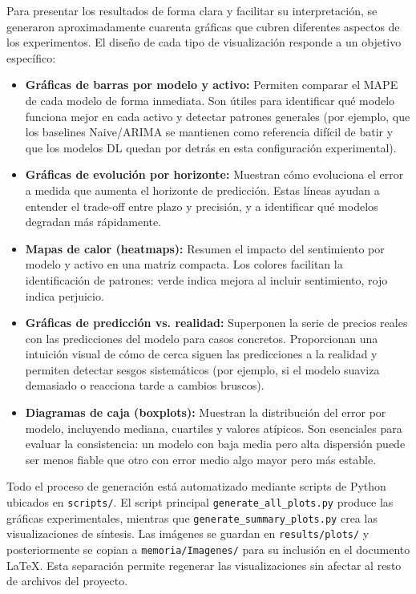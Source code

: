 Para presentar los resultados de forma clara y facilitar su interpretación, se generaron aproximadamente cuarenta gráficas que cubren diferentes aspectos de los experimentos. El diseño de cada tipo de visualización responde a un objetivo específico:

\begin{itemize}
    \item \textbf{Gráficas de barras por modelo y activo:} Permiten comparar el MAPE de cada modelo de forma inmediata. Son útiles para identificar qué modelo funciona mejor en cada activo y detectar patrones generales (por ejemplo, que los baselines Naive/ARIMA se mantienen como referencia difícil de batir y que los modelos DL quedan por detrás en esta configuración experimental).
    
    \item \textbf{Gráficas de evolución por horizonte:} Muestran cómo evoluciona el error a medida que aumenta el horizonte de predicción. Estas líneas ayudan a entender el trade-off entre plazo y precisión, y a identificar qué modelos degradan más rápidamente.
    
    \item \textbf{Mapas de calor (heatmaps):} Resumen el impacto del sentimiento por modelo y activo en una matriz compacta. Los colores facilitan la identificación de patrones: verde indica mejora al incluir sentimiento, rojo indica perjuicio.
    
    \item \textbf{Gráficas de predicción vs. realidad:} Superponen la serie de precios reales con las predicciones del modelo para casos concretos. Proporcionan una intuición visual de cómo de cerca siguen las predicciones a la realidad y permiten detectar sesgos sistemáticos (por ejemplo, si el modelo suaviza demasiado o reacciona tarde a cambios bruscos).
    
    \item \textbf{Diagramas de caja (boxplots):} Muestran la distribución del error por modelo, incluyendo mediana, cuartiles y valores atípicos. Son esenciales para evaluar la consistencia: un modelo con baja media pero alta dispersión puede ser menos fiable que otro con error medio algo mayor pero más estable.
\end{itemize}

Todo el proceso de generación está automatizado mediante scripts de Python ubicados en \texttt{scripts/}. El script principal \texttt{generate\_all\_plots.py} produce las gráficas experimentales, mientras que \texttt{generate\_summary\_plots.py} crea las visualizaciones de síntesis. Las imágenes se guardan en \texttt{results/plots/} y posteriormente se copian a \texttt{memoria/Imagenes/} para su inclusión en el documento LaTeX. Esta separación permite regenerar las visualizaciones sin afectar al resto de archivos del proyecto.
